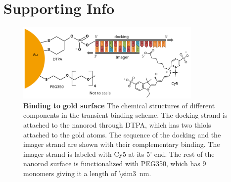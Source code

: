 \graphicspath{{chapters/c5_transient_binding/si-figures/}}
\section{Supporting Info}
\begin{figure}[ht]
  \centering
  \includegraphics[width=0.8\textwidth]{AuNR-SS_bonding}
  \makeatletter
  \renewcommand{\fnum@figure}{\figurename~S\thefigure}
  \makeatother
  \caption{\textbf{Binding to gold surface} The chemical structures of different components in the transient binding scheme.
  The docking strand is attached to the nanorod through DTPA, which has two thiols attached to the gold atoms.
  The sequence of the docking and the imager strand are shown with their complementary binding.
  The imager strand is labeled with Cy5 at its 5' end.
  The rest of the nanorod surface is functionalized with PEG350, which has 9 monomers giving it a length of \SI{\sim3}{\nm}.}
  \label{SIfig:AuNR-SS_bonding}
\end{figure}


